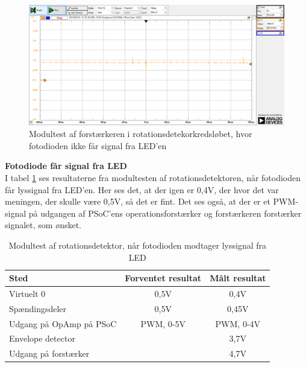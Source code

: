 \begin{figure}[H]
	\centering
	\includegraphics[width=\textwidth]{Test/images/AffyringTest/IkkeSe/udgang_forstaerker}
	\caption{Modultest af forstærkeren i rotationsdetekorkredsløbet, hvor fotodioden ikke får signal fra LED'en}
	\label{fig:udgangforstaerkerIkkeSe}
\end{figure}

\noindent \textbf{Fotodiode får signal fra LED} \\
\noindent I tabel \ref{dioderSe} ses resultaterne fra modultesten af rotationsdetektoren, når fotodioden får lyssignal fra LED'en. Her ses det, at der igen er 0,4V, der hvor det var meningen, der skulle være 0,5V, så det er fint. Det ses også, at der er et PWM-signal på udgangen af PSoC'ens operationsforstærker og forstærkeren forstærker signalet, som ønsket. 

\begin{table}[H]
	\centering
	\begin{tabular}{|l|c|c|}
		\hline
		\textbf{Sted}           & \textbf{Forventet resultat} & \textbf{Målt resultat} \\ \hline
		Virtuelt 0              & 0,5V                        & 0,4V                   \\ \hline
		Spændingsdeler          & 0,5V                        & 0,45V                  \\ \hline
		Udgang på OpAmp på PSoC & PWM, 0-5V                   & PWM, 0-4V              \\ \hline
		Envelope detector       & \multicolumn{1}{l|}{}       & 3,7V                   \\ \hline
		Udgang på forstærker    & \multicolumn{1}{l|}{}       & 4,7V                   \\ \hline
	\end{tabular}
	\caption{Modultest af rotationsdetektor, når fotodioden modtager lyssignal fra LED}
	\label{dioderSe}
\end{table}

